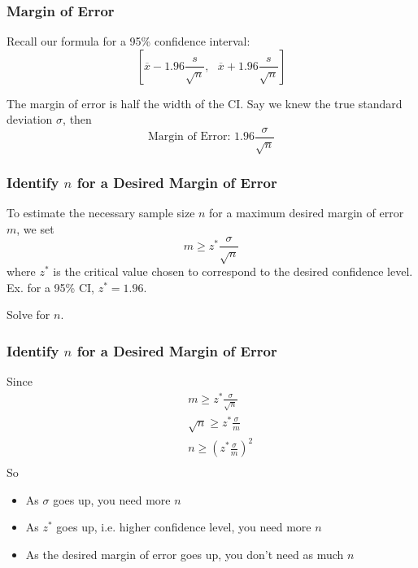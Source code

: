 \documentclass[handout]{beamer}
\newcommand{\blue}[1]{\textcolor{blue2}{#1}}
\begin{document}
\begin{frame}
\frametitle{Margin of Error}
Recall our formula for a 95\% confidence interval:
\[\left[
\overline{x} - 1.96 \frac{s}{\sqrt n}, \mbox{  }
\overline{x} + 1.96 \frac{s}{\sqrt n}
\right]\]

\pause The margin of error is half the width of the CI.  Say we knew the \blue{true} standard deviation $\sigma$, then
\[
\mbox{Margin of Error: } 1.96 \frac{\sigma}{\sqrt n} 
\]
\end{frame}



\begin{frame}
\frametitle{Identify $n$ for a Desired Margin of Error}
To estimate the necessary sample size $n$ for a maximum desired margin of error $m$, we set
\[
m \geq z^* \frac{\sigma}{\sqrt{n}}
\]
\pause where $z^*$ is the \blue{critical value} chosen to correspond to the desired confidence level.  Ex. for a 95\% CI, $z^*=1.96$.

\vspace{0.25cm}

\pause Solve for $n$.  
\end{frame}


\begin{frame}
\frametitle{Identify $n$ for a Desired Margin of Error}
Since
\begin{eqnarray*}
&&m \geq z^*\frac{\sigma}{\sqrt{n}}\\
&& \sqrt{n} \geq z^*\frac{\sigma}{m}\\
&& n \geq \left(z^*\frac{\sigma}{m}\right)^2\\
\end{eqnarray*}
\pause So
\begin{itemize}
\pause\item As $\sigma$ goes up, you need more $n$
\pause\item As $z^*$ goes up, i.e. higher confidence level, you need more $n$
\pause\item As the desired margin of error goes up, you don't need as much $n$
\end{itemize}

\end{frame}
\end{document}
